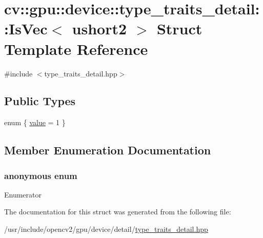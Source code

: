 \hypertarget{structcv_1_1gpu_1_1device_1_1type__traits__detail_1_1IsVec_3_01ushort2_01_4}{\section{cv\-:\-:gpu\-:\-:device\-:\-:type\-\_\-traits\-\_\-detail\-:\-:Is\-Vec$<$ ushort2 $>$ Struct Template Reference}
\label{structcv_1_1gpu_1_1device_1_1type__traits__detail_1_1IsVec_3_01ushort2_01_4}
}


{\ttfamily \#include $<$type\-\_\-traits\-\_\-detail.\-hpp$>$}

\subsection*{Public Types}
\begin{DoxyCompactItemize}
\item 
enum \{ \hyperlink{structcv_1_1gpu_1_1device_1_1type__traits__detail_1_1IsVec_3_01ushort2_01_4_a9eb2b51e5157462bd18b9c81e16b8f57a6f405d901aba9dff514298a97ef48152}{value} = 1
 \}
\end{DoxyCompactItemize}


\subsection{Member Enumeration Documentation}
\hypertarget{structcv_1_1gpu_1_1device_1_1type__traits__detail_1_1IsVec_3_01ushort2_01_4_a9eb2b51e5157462bd18b9c81e16b8f57}{\subsubsection[{anonymous enum}]{\setlength{\rightskip}{0pt plus 5cm}anonymous enum}}\label{structcv_1_1gpu_1_1device_1_1type__traits__detail_1_1IsVec_3_01ushort2_01_4_a9eb2b51e5157462bd18b9c81e16b8f57}
\begin{Desc}
\item[Enumerator]\par
\begin{description}
\item[{\em 
\hypertarget{structcv_1_1gpu_1_1device_1_1type__traits__detail_1_1IsVec_3_01ushort2_01_4_a9eb2b51e5157462bd18b9c81e16b8f57a6f405d901aba9dff514298a97ef48152}{value}\label{structcv_1_1gpu_1_1device_1_1type__traits__detail_1_1IsVec_3_01ushort2_01_4_a9eb2b51e5157462bd18b9c81e16b8f57a6f405d901aba9dff514298a97ef48152}
}]\end{description}
\end{Desc}


The documentation for this struct was generated from the following file\-:\begin{DoxyCompactItemize}
\item 
/usr/include/opencv2/gpu/device/detail/\hyperlink{type__traits__detail_8hpp}{type\-\_\-traits\-\_\-detail.\-hpp}\end{DoxyCompactItemize}
